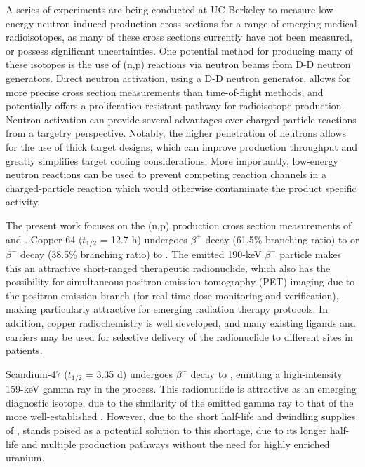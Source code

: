 \documentclass[5p]{elsarticle}
\begin{document}
A series of experiments are being conducted at UC Berkeley to measure low-energy neutron-induced production cross sections for a range of emerging medical radioisotopes, as many of these cross sections currently have not been measured, or possess significant uncertainties.   One potential method for producing many of these isotopes is the use of (n,p) reactions via neutron beams from D-D neutron generators. Direct neutron activation, using a D-D neutron generator, allows for more precise cross section measurements than time-of-flight methods, and potentially offers a proliferation-resistant pathway for radioisotope production. Neutron activation can provide several advantages over charged-particle reactions from a targetry perspective. Notably, the higher penetration of neutrons allows for the use of thick target designs, which can improve production throughput and greatly simplifies target cooling considerations. More importantly, low-energy neutron reactions can be used to prevent competing reaction channels in a charged-particle reaction which would otherwise contaminate the product specific activity.

The present work focuses on the (n,p) production cross section measurements of  and . Copper-64  ($t_{1/2}$ = 12.7 h) undergoes $\beta^+$ decay (61.5\% branching ratio) to  or $\beta^-$ decay (38.5\% branching ratio) to . The emitted 190-keV $\beta^-$ particle makes this an  attractive short-ranged therapeutic radionuclide, which also has the possibility for simultaneous positron emission tomography (PET) imaging  due to the positron emission branch (for real-time dose monitoring and verification),  making  particularly attractive for emerging radiation therapy protocols. In addition, copper radiochemistry is well developed, and many existing ligands and carriers may be used for selective delivery of the radionuclide to different sites in patients.

Scandium-47 ($t_{1/2}$ = 3.35 d) undergoes $\beta^-$ decay to , emitting a high-intensity 159-keV gamma ray in the process. This radionuclide is  attractive as an emerging diagnostic isotope, due to the similarity of the emitted gamma ray to that of the more well-established . However, due to the short half-life  and dwindling supplies of ,  stands poised as a potential solution to this shortage, due to its longer half-life and multiple production pathways without the need for highly enriched uranium.
\end{document}
